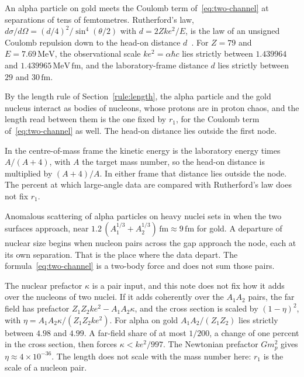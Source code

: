 \documentclass[a4paper]{article}
\begin{document}
An alpha particle on gold meets the Coulomb term of~\eqref{eq:two-channel} at separations of tens of femtometres. Rutherford's law, \(d\sigma/d\Omega=(d/4)^{2}/\sin^{4}(\theta/2)\) with \(d=2Zke^{2}/E\), is the law of an unsigned Coulomb repulsion down to the head-on distance \(d\)~\cite{rutherford1911,geiger1913}. For \(Z=79\) and \(E=7.69\,\mathrm{MeV}\), the observational scale \(ke^{2}=\alpha\hbar c\) lies strictly between \(1.439964\) and \(1.439965\,\mathrm{MeV\,fm}\), and the laboratory-frame distance \(d\) lies strictly between \(29\) and \(30\,\mathrm{fm}\).

By the length rule of Section~\ref{rule:length}, the alpha particle and the gold nucleus interact as bodies of nucleons, whose protons are in proton chaos, and the length read between them is the one fixed by \(r_1\), for the Coulomb term of~\eqref{eq:two-channel} as well. The head-on distance lies outside the first node.

In the centre-of-mass frame the kinetic energy is the laboratory energy times \(A/(A+4)\), with \(A\) the target mass number, so the head-on distance is multiplied by \((A+4)/A\). In either frame that distance lies outside the node. The percent at which large-angle data are compared with Rutherford's law does not fix \(r_1\).

Anomalous scattering of alpha particles on heavy nuclei sets in when the two surfaces approach, near \(1.2\,(A_1^{1/3}+A_2^{1/3})\,\mathrm{fm}\approx 9\,\mathrm{fm}\) for gold. A departure of nuclear size begins when nucleon pairs across the gap approach the node, each at its own separation. That is the place where the data depart. The formula~\eqref{eq:two-channel} is a two-body force and does not sum those pairs.

The nuclear prefactor \(\kappa\) is a pair input, and this note does not fix how it adds over the nucleons of two nuclei. If it adds coherently over the \(A_1A_2\) pairs, the far field has prefactor \(Z_1Z_2ke^{2}-A_1A_2\kappa\), and the cross section is scaled by \((1-\eta)^{2}\), with \(\eta=A_1A_2\kappa/(Z_1Z_2ke^{2})\). For alpha on gold \(A_1A_2/(Z_1Z_2)\) lies strictly between \(4.98\) and \(4.99\). A far-field share of at most \(1/200\), a change of one percent in the cross section, then forces \(\kappa<ke^{2}/997\). The Newtonian prefactor \(Gm_p^{2}\) gives \(\eta\approx 4\times 10^{-36}\). The length does not scale with the mass number here: \(r_1\) is the scale of a nucleon pair.
\end{document}
